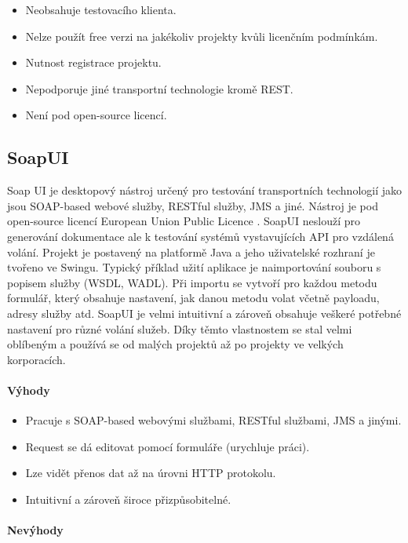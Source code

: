 \documentclass[11pt,twoside,a4paper]{book}
\begin{document}
\begin{itemize}
  \item Neobsahuje testovacího klienta.
  \item Nelze použít free verzi na jakékoliv projekty kvůli licenčním podmínkám.
  \item Nutnost registrace projektu.
  \item Nepodporuje jiné transportní technologie kromě REST.
  \item Není pod open-source licencí.
\end{itemize}

\subsection{SoapUI}

Soap UI \cite{SoapUIHome} je desktopový nástroj určený pro testování
transportních technologií jako jsou SOAP-based webové služby, RESTful služby,
JMS a jiné. Nástroj je pod open-source licencí European Union Public
Licence \cite{EUPL07}. SoapUI neslouží pro generování dokumentace ale k testování
systémů vystavujících API pro vzdálená volání. Projekt je postavený na platformě
Java a jeho uživatelské rozhraní je tvořeno ve Swingu. Typický příklad užití
aplikace je naimportování souboru s popisem služby (WSDL, WADL). Při importu se
vytvoří pro každou metodu formulář, který obsahuje nastavení, jak danou metodu
volat včetně payloadu, adresy služby atd. SoapUI je velmi intuitivní a zároveň
obsahuje veškeré potřebné nastavení pro různé volání služeb. Díky těmto
vlastnostem se stal velmi oblíbeným a používá se od malých projektů až po
projekty ve velkých korporacích.

\paragraph{Výhody}

\begin{itemize}
  \item Pracuje s SOAP-based webovými službami, RESTful službami, JMS a jinými.
  \item Request se dá editovat pomocí formuláře (urychluje práci).
  \item Lze vidět přenos dat až na úrovni HTTP protokolu.
  \item Intuitivní a zároveň široce přizpůsobitelné.
\end{itemize}

\paragraph{Nevýhody}
\end{document}
